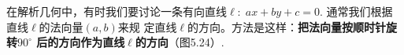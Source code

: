 在解析几何中，有时我们要讨论一条有向直线$\ell:\; ax+
by+c=0$. 通常我们根据直线$\ell$的法向量$(a,b)$来规
定直线$\ell$的方向。方法是这样：\textbf{把法向量按顺时针旋转$90^{\circ}$
后的方向作为直线$\ell$的方向}（图5.24）.












\begin{blk}
    
\end{blk}

\begin{example}
    
\end{example}

\begin{solution}
    
\end{solution}




\begin{example}
    
\end{example}

\begin{solution}
    
\end{solution}

\begin{example}
    
\end{example}

\begin{solution}
    
\end{solution}

\begin{example}
    
\end{example}

